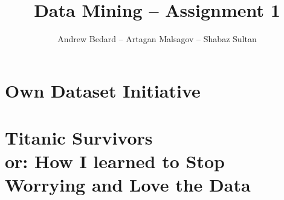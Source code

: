 \documentclass{llncs}
\title{Data Mining -- Assignment 1}
\author{Andrew Bedard -- Artagan Malsagov -- Shabaz Sultan}
\begin{document}
\maketitle
\section{Own Dataset Initiative}

\pagebreak
\section{Titanic Survivors\\ \large or: How I learned to Stop Worrying and Love the Data}
\end{document}
